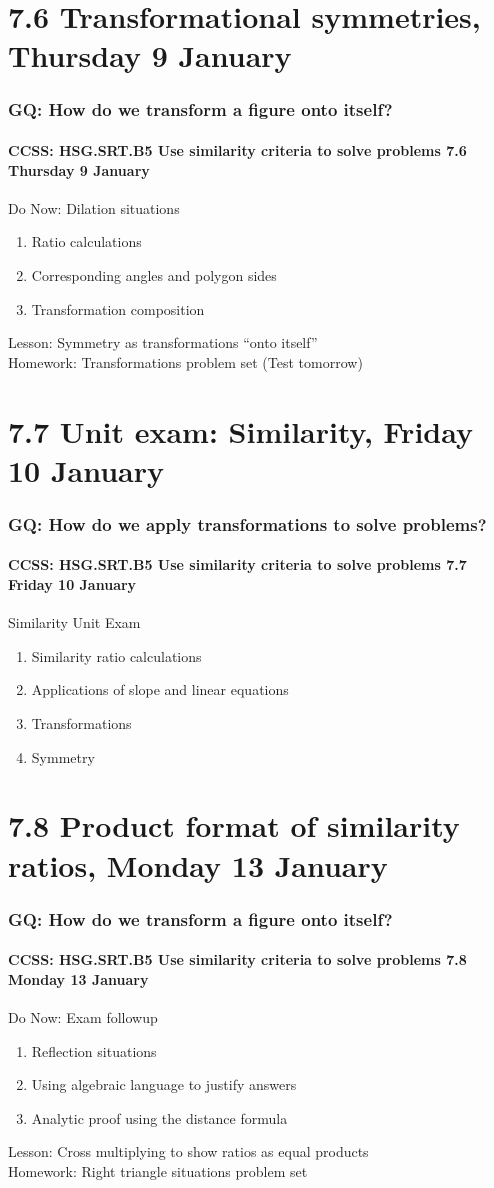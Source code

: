 \documentclass{beamer}
\begin{document}
\section{7.6 Transformational symmetries, Thursday 9 January}
\frame
{
  \frametitle{GQ: How do we transform a figure onto itself?}
  \framesubtitle{CCSS: HSG.SRT.B5 Use similarity criteria to solve problems \hfill \alert{7.6 Thursday 9 January}}

  \begin{block}{Do Now: Dilation situations}
  \begin{enumerate}
    \item Ratio calculations
    \item Corresponding angles and polygon sides
    \item Transformation composition
  \end{enumerate}
  \end{block}
  Lesson: Symmetry as transformations ``onto itself'' \\[0.5cm]
  Homework: Transformations problem set (\alert{Test tomorrow})
}

\section{7.7 Unit exam: Similarity, Friday 10 January}
\frame
{
  \frametitle{GQ: How do we apply transformations to solve problems?}
  \framesubtitle{CCSS: HSG.SRT.B5 Use similarity criteria to solve problems \hfill \alert{7.7 Friday 10 January}}

  \begin{block}{Similarity Unit Exam}
  \begin{enumerate}
    \item Similarity ratio calculations
    \item Applications of slope and linear equations
    \item Transformations
    \item Symmetry
  \end{enumerate}
  \end{block}
}

\section{7.8 Product format of similarity ratios, Monday 13 January}
\frame
{
  \frametitle{GQ: How do we transform a figure onto itself?}
  \framesubtitle{CCSS: HSG.SRT.B5 Use similarity criteria to solve problems \hfill \alert{7.8 Monday 13 January}}

  \begin{block}{Do Now: Exam followup}
  \begin{enumerate}
    \item Reflection situations
    \item Using algebraic language to justify answers
    \item Analytic proof using the distance formula
  \end{enumerate}
  \end{block}
  Lesson: Cross multiplying to show ratios as equal products \\[0.5cm]
  Homework: Right triangle situations problem set
}
\end{document}
